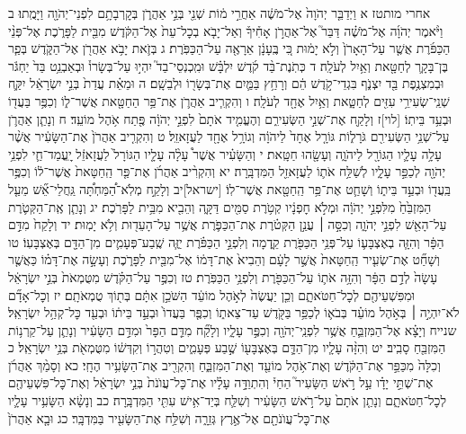 \documentclass[twoside, openany, parskip=half, 11pt]{book}
\begin{document}
אחרי מותטז א וַיְדַבֵּ֤ר יְהֹוָה֙ אֶל־מֹשֶׁ֔ה אַחֲרֵ֣י מ֔וֹת שְׁנֵ֖י בְּנֵ֣י אַהֲרֹ֑ן בְּקׇרְבָתָ֥ם לִפְנֵי־יְהֹוָ֖ה וַיָּמֻֽתוּ׃ ב וַיֹּ֨אמֶר יְהֹוָ֜ה אֶל־מֹשֶׁ֗ה דַּבֵּר֮ אֶל־אַהֲרֹ֣ן אָחִ֒יךָ֒ וְאַל־יָבֹ֤א בְכׇל־עֵת֙ אֶל־הַקֹּ֔דֶשׁ מִבֵּ֖ית לַפָּרֹ֑כֶת אֶל־פְּנֵ֨י הַכַּפֹּ֜רֶת אֲשֶׁ֤ר עַל־הָאָרֹן֙ וְלֹ֣א יָמ֔וּת כִּ֚י בֶּֽעָנָ֔ן אֵרָאֶ֖ה עַל־הַכַּפֹּֽרֶת׃ ג בְּזֹ֛את יָבֹ֥א אַהֲרֹ֖ן אֶל־הַקֹּ֑דֶשׁ בְּפַ֧ר בֶּן־בָּקָ֛ר לְחַטָּ֖את וְאַ֥יִל לְעֹלָֽה׃ ד כְּתֹֽנֶת־בַּ֨ד קֹ֜דֶשׁ יִלְבָּ֗שׁ וּמִֽכְנְסֵי־בַד֮ יִהְי֣וּ עַל־בְּשָׂרוֹ֒ וּבְאַבְנֵ֥ט בַּד֙ יַחְגֹּ֔ר וּבְמִצְנֶ֥פֶת בַּ֖ד יִצְנֹ֑ף בִּגְדֵי־קֹ֣דֶשׁ הֵ֔ם וְרָחַ֥ץ בַּמַּ֛יִם אֶת־בְּשָׂר֖וֹ וּלְבֵשָֽׁם׃ ה וּמֵאֵ֗ת עֲדַת֙ בְּנֵ֣י יִשְׂרָאֵ֔ל יִקַּ֛ח שְׁנֵֽי־שְׂעִירֵ֥י עִזִּ֖ים לְחַטָּ֑את וְאַ֥יִל אֶחָ֖ד לְעֹלָֽה׃ ו וְהִקְרִ֧יב אַהֲרֹ֛ן אֶת־פַּ֥ר הַחַטָּ֖את אֲשֶׁר־ל֑וֹ וְכִפֶּ֥ר בַּעֲד֖וֹ וּבְעַ֥ד בֵּיתֽוֹ׃ [לוי]ז וְלָקַ֖ח אֶת־שְׁנֵ֣י הַשְּׂעִירִ֑ם וְהֶעֱמִ֤יד אֹתָם֙ לִפְנֵ֣י יְהֹוָ֔ה פֶּ֖תַח אֹ֥הֶל מוֹעֵֽד׃ ח וְנָתַ֧ן אַהֲרֹ֛ן עַל־שְׁנֵ֥י הַשְּׂעִירִ֖ם גֹּרָל֑וֹת גּוֹרָ֤ל אֶחָד֙ לַיהֹוָ֔ה וְגוֹרָ֥ל אֶחָ֖ד לַעֲזָאזֵֽל׃ ט וְהִקְרִ֤יב אַהֲרֹן֙ אֶת־הַשָּׂעִ֔יר אֲשֶׁ֨ר עָלָ֥ה עָלָ֛יו הַגּוֹרָ֖ל לַיהֹוָ֑ה וְעָשָׂ֖הוּ חַטָּֽאת׃ י וְהַשָּׂעִ֗יר אֲשֶׁר֩ עָלָ֨ה עָלָ֤יו הַגּוֹרָל֙ לַעֲזָאזֵ֔ל יׇֽעֳמַד־חַ֛י לִפְנֵ֥י יְהֹוָ֖ה לְכַפֵּ֣ר עָלָ֑יו לְשַׁלַּ֥ח אֹת֛וֹ לַעֲזָאזֵ֖ל הַמִּדְבָּֽרָה׃ יא וְהִקְרִ֨יב אַהֲרֹ֜ן אֶת־פַּ֤ר הַֽחַטָּאת֙ אֲשֶׁר־ל֔וֹ וְכִפֶּ֥ר בַּֽעֲד֖וֹ וּבְעַ֣ד בֵּית֑וֹ וְשָׁחַ֛ט אֶת־פַּ֥ר הַֽחַטָּ֖את אֲשֶׁר־לֽוֹ׃ [ישראל]יב וְלָקַ֣ח מְלֹֽא־הַ֠מַּחְתָּ֠ה גַּֽחֲלֵי־אֵ֞שׁ מֵעַ֤ל הַמִּזְבֵּ֙חַ֙ מִלִּפְנֵ֣י יְהֹוָ֔ה וּמְלֹ֣א חׇפְנָ֔יו קְטֹ֥רֶת סַמִּ֖ים דַּקָּ֑ה וְהֵבִ֖יא מִבֵּ֥ית לַפָּרֹֽכֶת׃ יג וְנָתַ֧ן אֶֽת־הַקְּטֹ֛רֶת עַל־הָאֵ֖שׁ לִפְנֵ֣י יְהֹוָ֑ה וְכִסָּ֣ה ׀ עֲנַ֣ן הַקְּטֹ֗רֶת אֶת־הַכַּפֹּ֛רֶת אֲשֶׁ֥ר עַל־הָעֵד֖וּת וְלֹ֥א יָמֽוּת׃ יד וְלָקַח֙ מִדַּ֣ם הַפָּ֔ר וְהִזָּ֧ה בְאֶצְבָּע֛וֹ עַל־פְּנֵ֥י הַכַּפֹּ֖רֶת קֵ֑דְמָה וְלִפְנֵ֣י הַכַּפֹּ֗רֶת יַזֶּ֧ה שֶֽׁבַע־פְּעָמִ֛ים מִן־הַדָּ֖ם בְּאֶצְבָּעֽוֹ׃ טו וְשָׁחַ֞ט אֶת־שְׂעִ֤יר הַֽחַטָּאת֙ אֲשֶׁ֣ר לָעָ֔ם וְהֵבִיא֙ אֶת־דָּמ֔וֹ אֶל־מִבֵּ֖ית לַפָּרֹ֑כֶת וְעָשָׂ֣ה אֶת־דָּמ֗וֹ כַּאֲשֶׁ֤ר עָשָׂה֙ לְדַ֣ם הַפָּ֔ר וְהִזָּ֥ה אֹת֛וֹ עַל־הַכַּפֹּ֖רֶת וְלִפְנֵ֥י הַכַּפֹּֽרֶת׃ טז וְכִפֶּ֣ר עַל־הַקֹּ֗דֶשׁ מִטֻּמְאֹת֙ בְּנֵ֣י יִשְׂרָאֵ֔ל וּמִפִּשְׁעֵיהֶ֖ם לְכׇל־חַטֹּאתָ֑ם וְכֵ֤ן יַעֲשֶׂה֙ לְאֹ֣הֶל מוֹעֵ֔ד הַשֹּׁכֵ֣ן אִתָּ֔ם בְּת֖וֹךְ טֻמְאֹתָֽם׃ יז וְכׇל־אָדָ֞ם לֹא־יִהְיֶ֣ה ׀ בְּאֹ֣הֶל מוֹעֵ֗ד בְּבֹא֛וֹ לְכַפֵּ֥ר בַּקֹּ֖דֶשׁ עַד־צֵאת֑וֹ וְכִפֶּ֤ר בַּעֲדוֹ֙ וּבְעַ֣ד בֵּית֔וֹ וּבְעַ֖ד כׇּל־קְהַ֥ל יִשְׂרָאֵֽל׃ שנייח וְיָצָ֗א אֶל־הַמִּזְבֵּ֛חַ אֲשֶׁ֥ר לִפְנֵֽי־יְהֹוָ֖ה וְכִפֶּ֣ר עָלָ֑יו וְלָקַ֞ח מִדַּ֤ם הַפָּר֙ וּמִדַּ֣ם הַשָּׂעִ֔יר וְנָתַ֛ן עַל־קַרְנ֥וֹת הַמִּזְבֵּ֖חַ סָבִֽיב׃ יט וְהִזָּ֨ה עָלָ֧יו מִן־הַדָּ֛ם בְּאֶצְבָּע֖וֹ שֶׁ֣בַע פְּעָמִ֑ים וְטִהֲר֣וֹ וְקִדְּשׁ֔וֹ מִטֻּמְאֹ֖ת בְּנֵ֥י יִשְׂרָאֵֽל׃ כ וְכִלָּה֙ מִכַּפֵּ֣ר אֶת־הַקֹּ֔דֶשׁ וְאֶת־אֹ֥הֶל מוֹעֵ֖ד וְאֶת־הַמִּזְבֵּ֑חַ וְהִקְרִ֖יב אֶת־הַשָּׂעִ֥יר הֶחָֽי׃ כא וְסָמַ֨ךְ אַהֲרֹ֜ן אֶת־שְׁתֵּ֣י יָדָ֗ו עַ֣ל רֹ֣אשׁ הַשָּׂעִיר֮ הַחַי֒ וְהִתְוַדָּ֣ה עָלָ֗יו אֶת־כׇּל־עֲוֺנֹת֙ בְּנֵ֣י יִשְׂרָאֵ֔ל וְאֶת־כׇּל־פִּשְׁעֵיהֶ֖ם לְכׇל־חַטֹּאתָ֑ם וְנָתַ֤ן אֹתָם֙ עַל־רֹ֣אשׁ הַשָּׂעִ֔יר וְשִׁלַּ֛ח בְּיַד־אִ֥ישׁ עִתִּ֖י הַמִּדְבָּֽרָה׃ כב וְנָשָׂ֨א הַשָּׂעִ֥יר עָלָ֛יו אֶת־כׇּל־עֲוֺנֹתָ֖ם אֶל־אֶ֣רֶץ גְּזֵרָ֑ה וְשִׁלַּ֥ח אֶת־הַשָּׂעִ֖יר בַּמִּדְבָּֽר׃ כג וּבָ֤א אַהֲרֹן֙ 
\end{document}
